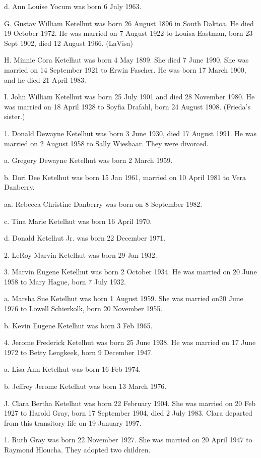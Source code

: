 \documentclass[a4paper]{article}
\begin{document}
d. Ann Louise Yocum was born 6 July 1963.

G. Gustav William Ketelhut was born 26 August 1896 in South Daktoa.  He died 19 October 1972.  He was married on 7 August 1922 to Louisa Eastman, born 23 Sept 1902, died 12 August 1966. (LaVisa)

H.  Minnie Cora Ketelhut was born 4 May 1899.  She died 7 June 1990.  She was married on 14 September 1921 to Erwin Fascher.  He was born 17 March 1900, and he died 21 April 1983.

I. John William Ketelhut was born 25 July 1901 and died 28 November 1980.  He was married on 18 April 1928 to Soyfia Drafahl, born 24 August 1908.  (Frieda's sister.)

1. Donald Dewayne Ketelhut was born 3 June 1930, died 17 August 1991.  He was married on 2 August 1958 to Sally Wieshaar.  They were divorced.

a. Gregory Dewayne Ketelhut was born 2 March 1959.

b. Dori Dee Ketelhut was born 15 Jan 1961, married on 10 April 1981 to Vera Danberry.

aa. Rebecca Christine Danberry was born on 8 September 1982.

c. Tina Marie Ketelhut was born 16 April 1970.

d. Donald Ketelhut Jr. was born 22 December 1971.

2. LeRoy Marvin Ketelhut was born 29 Jan 1932.

3. Marvin Eugene Ketelhut was born 2 October 1934.  He was married on 20 June 1958 to Mary Hague, born 7 July 1932.

a. Marsha Sue Ketelhut was born 1 August 1959.  She was married on20 June 1976 to Lowell Schierkolk, born 20 November 1955.

b. Kevin Eugene Ketelhut was born 3 Feb 1965.

4. Jerome Frederick Ketelhut was born 25 June 1938.  He was married on 17 June 1972 to Betty Lengkeek, born 9 December 1947.

a. Lisa Ann Ketelhut was born 16 Feb 1974.

b. Jeffrey Jerome Ketelhut was born 13 March 1976.

J. Clara Bertha Ketelhut was born 22 February 1904.  She was married on 20 Feb 1927 to Harold Gray, born 17 September 1904, died 2 July 1983.  Clara departed from this transitory life on 19 January 1997.  

1. Ruth Gray was born 22 November 1927.  She was married on 20 April 1947 to Raymond Hloucha.  They adopted two children.
\end{document}
